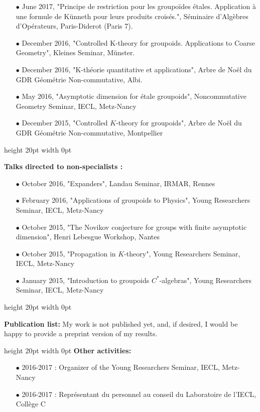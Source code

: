 \documentclass[a4paper,11pt]{article}
\newcommand\espace{\vrule height 20pt width 0pt}
\begin{document}
\begin{itemize}
\item[$\bullet$] June 2017, "Principe de restriction pour les groupoïdes étales. Application à une formule de Künneth pour leurs produits croisés.", Séminaire d'Algèbres d'Opérateurs, Paris-Diderot (Paris 7).
\item[$\bullet$] December 2016, "Controlled K-theory for groupoids. Applications to Coarse Geometry", Kleines Seminar, Münster.
\item[$\bullet$] December 2016, "K-théorie quantitative et applications", Arbre de Noël du GDR Géométrie Non-commutative, Albi.
\item[$\bullet$] May 2016, "Asymptotic dimension for étale groupoids", Noncommutative Geometry Seminar, IECL, Metz-Nancy
\item[$\bullet$] December 2015, "Controlled $K$-theory for groupoids", Arbre de Noël du GDR Géométrie Non-commutative, Montpellier
\end{itemize}
\espace

\textbf{Talks directed to non-specialists :}\\

\begin{itemize}
\item[$\bullet$] October 2016, "Expanders", Landau Seminar, IRMAR, Rennes %
\item[$\bullet$] February 2016, "Applications of groupoids to Physics", Young Researchers Seminar, IECL, Metz-Nancy
\item[$\bullet$] October 2015, "The Novikov conjecture for groups with finite asymptotic dimension", Henri Lebesgue Workshop, Nantes
\item[$\bullet$] October 2015, "Propagation in $K$-theory", Young Researchers Seminar, IECL, Metz-Nancy
\item[$\bullet$] January 2015, "Introduction to groupoids $C^*$-algebras", Young Researchers Seminar, IECL, Metz-Nancy
\end{itemize}
\espace

\textbf{Publication list:} My work is not published yet, and, if desired, I would be happy to provide a preprint version of my results.

\espace
\textbf{Other activities:} 
\begin{itemize}
\item[$\bullet$] 2016-2017 : Organizer of the Young Researchers Seminar, IECL, Metz-Nancy
\item[$\bullet$] 2016-2017 : Représentant du personnel au conseil du Laboratoire de l'IECL, Collège C
\end{itemize}
\end{document}
